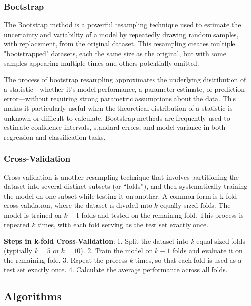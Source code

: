 \documentclass[aps,pra,english,notitlepage,reprint,nofootinbib]{revtex4-1}  %
\begin{document}
\subsubsection{Bootstrap}
The Bootstrap method is a powerful resampling technique used to estimate the uncertainty and variability of a model by repeatedly drawing random samples, with replacement, from the original dataset. This resampling creates multiple "bootstrapped" datasets, each the same size as the original, but with some samples appearing multiple times and others potentially omitted.

The process of bootstrap resampling approximates the underlying distribution of a statistic—whether it’s model performance, a parameter estimate, or prediction error—without requiring strong parametric assumptions about the data. This makes it particularly useful when the theoretical distribution of a statistic is unknown or difficult to calculate. Bootstrap methods are frequently used to estimate confidence intervals, standard errors, and model variance in both regression and classification tasks.


\subsubsection{Cross-Validation}
Cross-validation is another resampling technique that involves partitioning the dataset into several distinct subsets (or ``folds''), and then systematically training the model on one subset while testing it on another. A common form is k-fold cross-validation, where the dataset is divided into $k$ equally-sized folds. The model is trained on $k-1$ folds and tested on the remaining fold. This process is repeated $k$ times, with each fold serving as the test set exactly once.

\textbf{Steps in k-fold Cross-Validation}:
1. Split the dataset into $k$ equal-sized folds (typically $k=5$ or $k=10$).
2. Train the model on $k-1$ folds and evaluate it on the remaining fold.
3. Repeat the process $k$ times, so that each fold is used as a test set exactly once.
4. Calculate the average performance across all folds.


\subsection{Algorithms}\label{subsec:algorithms}
\end{document}
